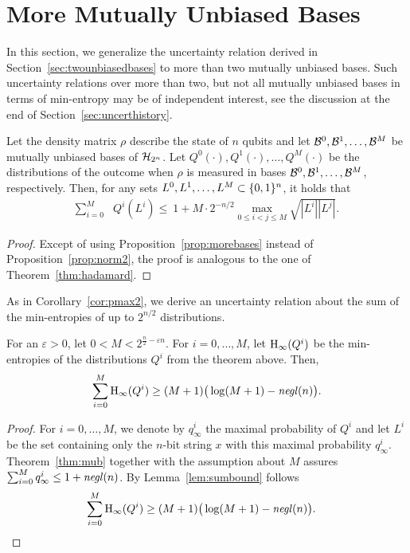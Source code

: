 \section{More Mutually Unbiased Bases}
\label{sec:moreunbiasedbases}
In this section, we generalize the uncertainty relation derived in
Section~\ref{sec:twounbiasedbases} to more than two mutually unbiased
bases. Such uncertainty relations over more than two, but not all mutually
unbiased bases in terms of  min-entropy may be of independent
interest, see the discussion at the end of Section~\ref{sec:uncerthistory}.

\begin{theorem} \label{thm:mub}
  Let the density matrix $\rho$ describe the state of $n$ qubits
  and let $\mathcal{B}^{0}, \mathcal{B}^{1}, \ldots, \mathcal{B}^{M}$ be mutually
  unbiased bases of $\mathcal{H}_{2^n}$. Let $Q^0(\cdot), Q^1(\cdot), \ldots,
  Q^M(\cdot)$ be the distributions of the outcome when $\rho$ is
  measured in bases $\mathcal{B}^{0}, \mathcal{B}^{1}, \ldots, \mathcal{B}^{M}$, respectively.
  Then, for any sets $L^0, L^1, \ldots, L^M \subset \{0,1\}^n$, it holds that
\begin{align*}
\sum_{i=0}^M& Q^i(L^i)
\leq \: 1 + M \cdot 2^{-n/2} \max_{0 \leq i<j \leq M} \sqrt{|L^i| |L^j|}.
\end{align*}
\end{theorem}
\begin{proof}
  Except of using Proposition~\ref{prop:morebases} instead of
  Proposition~\ref{prop:norm2}, the proof is analogous to the one of
  Theorem~\ref{thm:hadamard}.
\end{proof}

As in Corollary~\ref{cor:pmax2}, we derive an uncertainty relation about
the sum of the min-entropies of up to $2^{n/2}$ distributions.
\begin{corollary} \label{cor:generalhmax}
  For an $\varepsilon>0$, let $0< M < 2^{\frac{n}{2}-\varepsilon n}$.
  For $i=0,\ldots,M$, let $\operatorname{H}_{\infty}(Q^i)$ be the min-entropies of the
  distributions $Q^i$ from the theorem above. Then,
\[ \sum_{i=0}^M \operatorname{H}_{\infty}(Q^i) \geq (M+1) \big(\log (M+1) - \mathit{negl}({n})\big). \]
\end{corollary}
\begin{proof}
  For $i=0,\ldots,M$, we denote by $q_{\infty}^i$ the maximal
  probability of $Q^i$ and let $L^i$ be the set containing only the
  $n$-bit string $x$ with this maximal probability $q_{\infty}^i$.
  Theorem~\ref{thm:mub} together with the assumption about $M$ assures
  $\sum_{i=0}^M q_{\infty}^i \leq 1 + \mathit{negl}({n})$. By
  Lemma~\ref{lem:sumbound} follows
\begin{align*}
\sum_{i=0}^M \operatorname{H}_{\infty}(Q^i) &\geq (M+1) \big(\log(M+1) - \mathit{negl}({n})\big).
\end{align*}
\end{proof}


